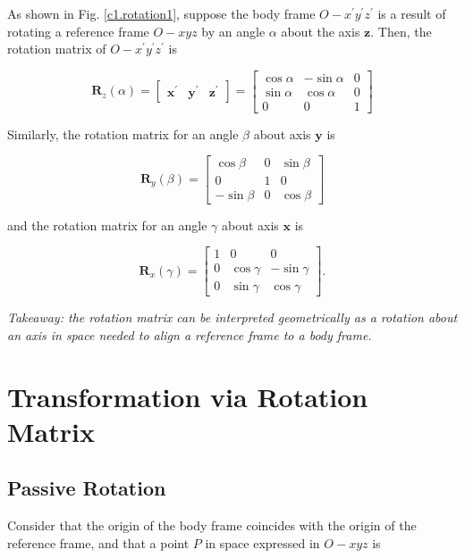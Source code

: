 \documentclass[10pt]{article}
\begin{document}
As shown in Fig. \ref{c1.rotation1}, suppose the body frame $O- x^{\prime} y^{\prime} z^{\prime}$ is a result of rotating  a reference frame $O- x y z$   by an angle $\alpha$ about the axis $\boldsymbol{z}$.  Then, the rotation matrix of $O- x^{\prime} y^{\prime} z^{\prime}$ is

$$
\boldsymbol{R}_{z}(\alpha)=\left[\begin{array}{lll}
\boldsymbol{x}^{\prime} & \boldsymbol{y}^{\prime} & \boldsymbol{z}^{\prime} 
\end{array}\right]=\left[\begin{array}{ccc}
\cos \alpha & -\sin \alpha & 0 \\
\sin \alpha & \cos \alpha & 0 \\
0 & 0 & 1
\end{array}\right]
$$

Similarly,  the rotation matrix for an angle $\beta$ about axis $\boldsymbol{y}$ is

$$
\boldsymbol{R}_{y}(\beta)  =\left[\begin{array}{ccc}
\cos \beta & 0 & \sin \beta \\
0 & 1 & 0 \\
-\sin \beta & 0 & \cos \beta
\end{array}\right]
$$

and the rotation matrix for an angle $\gamma$ about axis $\boldsymbol{x}$ is


$$
\boldsymbol{R}_{x}(\gamma)  =\left[\begin{array}{ccc}
1 & 0 & 0 \\
0 & \cos \gamma & -\sin \gamma \\
0 & \sin \gamma & \cos \gamma
\end{array}\right] .
$$

\emph{Takeaway: the rotation matrix can be interpreted geometrically as a rotation about an axis in space needed to align a reference frame to a body frame.}

\section{Transformation via Rotation Matrix}

\subsection{Passive Rotation}
Consider that the origin of the body frame coincides with the origin of the reference frame, and that a  point $P$ in space expressed in $O- x y z$ is
\end{document}
